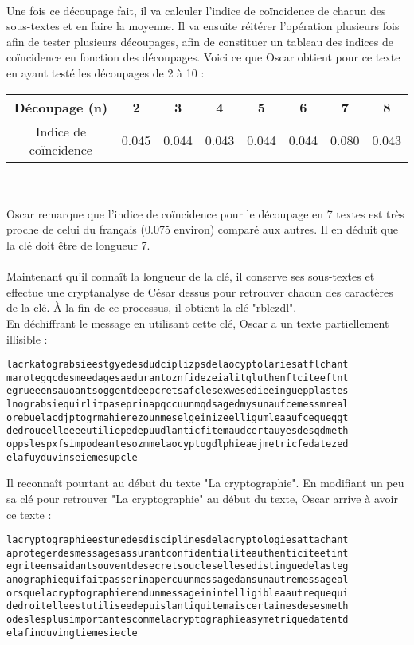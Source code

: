 		\\
		Une fois ce découpage fait, il va calculer l'indice de coïncidence de chacun des sous-textes et en faire la moyenne. Il va ensuite réitérer l'opération plusieurs fois afin de tester plusieurs découpages, afin de constituer un tableau des indices de coïncidence en fonction des découpages. Voici ce que Oscar obtient pour ce texte en ayant testé les découpages de 2 à 10 :\\
		\begin{tabular}{ | c | c | c | c | c | c | c | c | }
			\hline
Découpage (n) & 2 & 3 & 4 & 5 & 6 & 7 & 8 \\ \hline
Indice de coïncidence & 0.045 & 0.044 & 0.043 & 0.044 & 0.044 & 0.080 & 0.043 \\
			\hline
		\end{tabular} \\
		\\
		Oscar remarque que l'indice de coïncidence pour le découpage en 7 textes est très proche de celui du français (0.075 environ) comparé aux autres. Il en déduit que la clé doit être de longueur 7.\\
		\\
		Maintenant qu'il connaît la longueur de la clé, il conserve ses sous-textes et effectue une cryptanalyse de César dessus pour retrouver chacun des caractères de la clé. À la fin de ce processus, il obtient la clé "rblczdl".\\
		En déchiffrant le message en utilisant cette clé, Oscar a un texte partiellement illisible :
		\begin{lstlisting}
lacrkatograbsieestgyedesdudciplizpsdelaocyptolariesatflchant
marotegqcdesmeedagesaedurantoznfidezeialitqluthenftciteeftnt
egrueeensauoantsoggentdeepcretsafclesexwesedieeinguepplastes
lnograbsiequirlitpaseprinapqccuunmqdsagedmysunaufcemessmreal
orebuelacdjptogrmahierezounmeselgeinizeelligumleaaufcequeqgt
dedroueelleeeeutiliepedepuudlanticfitemaudcertauyesdesqdmeth
oppslespxfsimpodeantesozmmelaocyptogdlphieaejmetricfedatezed
elafuyduvinseiemesupcle
		\end{lstlisting}
		Il reconnaît pourtant au début du texte "La cryptographie". En modifiant un peu sa clé pour retrouver "La cryptographie" au début du texte, Oscar arrive à avoir ce texte :
		\begin{lstlisting}
lacryptographieestunedesdisciplinesdelacryptologiesattachant
aprotegerdesmessagesassurantconfidentialiteauthenticiteetint
egriteensaidantsouventdesecretsouclesellesedistinguedelasteg
anographiequifaitpasserinapercuunmessagedansunautremessageal
orsquelacryptographierendunmessageinintelligibleaautrequequi
dedroitelleestutiliseedepuislantiquitemaiscertainesdesesmeth
odeslesplusimportantescommelacryptographieasymetriquedatentd
elafinduvingtiemesiecle
		\end{lstlisting}
